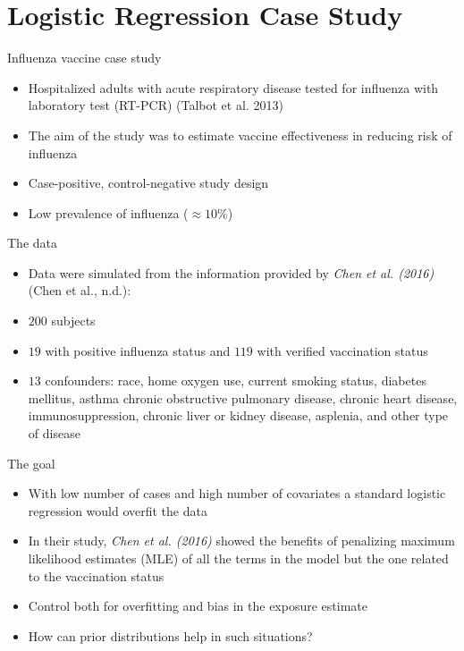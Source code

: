 \documentclass[ignorenonframetext,a4paper]{beamer}
\begin{document}
\section{Logistic Regression Case
Study}\label{logistic-regression-case-study}

\begin{frame}{Influenza vaccine case study}

\begin{itemize}
\item
  Hospitalized adults with acute respiratory disease tested for
  influenza with laboratory test (RT-PCR) (Talbot et al. 2013)
\item
  The aim of the study was to estimate vaccine effectiveness in reducing
  risk of influenza
\item
  Case-positive, control-negative study design
\item
  Low prevalence of influenza (\(\approx 10 \%\))
\end{itemize}

\end{frame}

\begin{frame}{The data}

\begin{itemize}
\item
  Data were simulated from the information provided by \emph{Chen et al.
  (2016)} (Chen et al., n.d.):
\item
  \(200\) subjects
\item
  \(19\) with positive influenza status and \(119\) with verified
  vaccination status
\item
  \(13\) confounders: race, home oxygen use, current smoking status,
  diabetes mellitus, asthma chronic obstructive pulmonary disease,
  chronic heart disease, immunosuppression, chronic liver or kidney
  disease, asplenia, and other type of disease
\end{itemize}

\end{frame}

\begin{frame}{The goal}

\begin{itemize}
\item
  With low number of cases and high number of covariates a standard
  logistic regression would overfit the data
\item
  In their study, \emph{Chen et al. (2016)} showed the benefits of
  penalizing maximum likelihood estimates (MLE) of all the terms in the
  model but the one related to the vaccination status
\item
  Control both for overfitting and bias in the exposure estimate
\item
  How can prior distributions help in such situations?
\end{itemize}

\end{frame}
\end{document}
